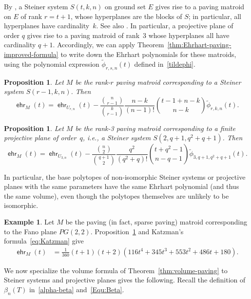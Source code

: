 \documentclass[11pt]{amsart}
\newtheorem{proposition}[theorem]{Proposition}
\theoremstyle{definition}
\newtheorem{example}[theorem]{Example}
\newcommand{\0}{\emptyset}
\DeclareMathOperator{\ehr}{\mathsf{ehr}}
\begin{document}
By \cite[Prop.~2.1.24]{Oxley}, a Steiner system $S(t,k,n)$ on ground set $E$ gives rise to a paving matroid on $E$ of rank $r=t+1$, whose hyperplanes are the blocks of $S$; in particular, all hyperplanes have cardinality~$k$.
See also \cite[p.202]{Welsh}.
In particular, a projective plane of order $q$ gives rise to a paving matroid of rank~3 whose hyperplanes all have cardinality $q+1$.
Accordingly, we can apply Theorem~\ref{thm:Ehrhart-paving-improved-formula} to write down the Ehrhart polynomials for these matroids, using the polynomial expression $\tilde\phi_{r,s,n}(t)$ defined in~\eqref{tildephi}.

\begin{proposition} \label{prop:ehrhart-Steiner}
Let $M$ be the rank-$r$ paving matroid corresponding to a Steiner system $S(r-1,k,n)$.
Then
\[
\ehr_{M}(t)=\ehr_{U_{r,n}}(t)-\frac{\binom{n}{r-1}}{\binom{k}{r-1}}\frac{n-k}{(n-1)!}\binom{t-1+n-k}{n-k} \tilde\phi_{r,k,n}(t).
\]
\end{proposition}

\begin{proposition} \label{prop:ehrhart-projective-plane}
Let $M$ be the rank-3 paving matroid corresponding to a finite projective plane of order~$q$, i.e., a Steiner system $S(2,q+1,q^2+q+1)$.
Then
\[
\ehr_{M}(t)=\ehr_{U_{3,n}}(t)-\frac{\binom{n}{2}}{\binom{q+1}{2}}\frac{q^2}{(q^2+q)!}\binom{t+q^2-1}{n-q-1} \tilde\phi_{3,q+1,q^2+q+1}(t).
\]
\end{proposition}

In particular, the base polytopes of non-isomorphic Steiner systems or projective planes with the same parameters have the same Ehrhart polynomial (and thus the same volume), even though the polytopes themselves are unlikely to be isomorphic.


\begin{example} \label{exa:Ehrhart-Fano}
Let $M$ be the paving (in fact, sparse paving) matroid corresponding to the Fano plane $PG(2,2)$.
Proposition~\ref{prop:ehrhart-projective-plane} and Katzman's formula~\eqref{eq:Katzman} give
\begin{align*}
\ehr_M(t)
&=\frac{1}{360}(t+1)(t+2)(116t^4+345t^3+553t^2+486t+180).
\end{align*}
\end{example}


We now specialize the volume formula of Theorem~\ref{thm:volume-paving} to Steiner systems and projective planes gives the following.
Recall the definition of $\beta_n(T)$ in~\eqref{alpha-beta} and~\eqref{Equ:Beta}.
\end{document}
